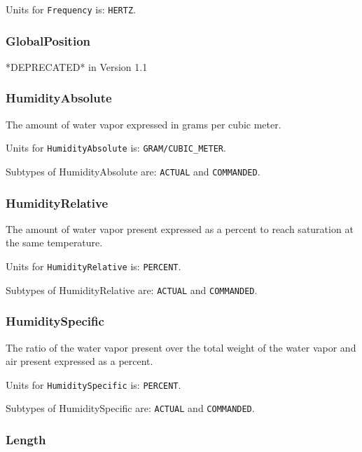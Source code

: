 Units for \texttt{Frequency} is: \texttt{HERTZ}.

\FloatBarrier

\subsubsection{GlobalPosition}
  \label{sec:GlobalPosition}


*DEPRECATED* in Version 1.1

\FloatBarrier

\subsubsection{HumidityAbsolute}
  \label{sec:HumidityAbsolute}


The amount of water vapor expressed in grams per cubic meter.


Units for \texttt{HumidityAbsolute} is: \texttt{GRAM/CUBIC_METER}.


Subtypes of HumidityAbsolute are: \texttt{ACTUAL} and \texttt{COMMANDED}. 
\FloatBarrier

\subsubsection{HumidityRelative}
  \label{sec:HumidityRelative}


The amount of water vapor present expressed as a percent to reach saturation at the same temperature.


Units for \texttt{HumidityRelative} is: \texttt{PERCENT}.


Subtypes of HumidityRelative are: \texttt{ACTUAL} and \texttt{COMMANDED}. 
\FloatBarrier

\subsubsection{HumiditySpecific}
  \label{sec:HumiditySpecific}


The ratio of the water vapor present over the total weight of the water vapor and air present expressed as a percent.



Units for \texttt{HumiditySpecific} is: \texttt{PERCENT}.


Subtypes of HumiditySpecific are: \texttt{ACTUAL} and \texttt{COMMANDED}. 
\FloatBarrier

\subsubsection{Length}
  \label{sec:Length}


